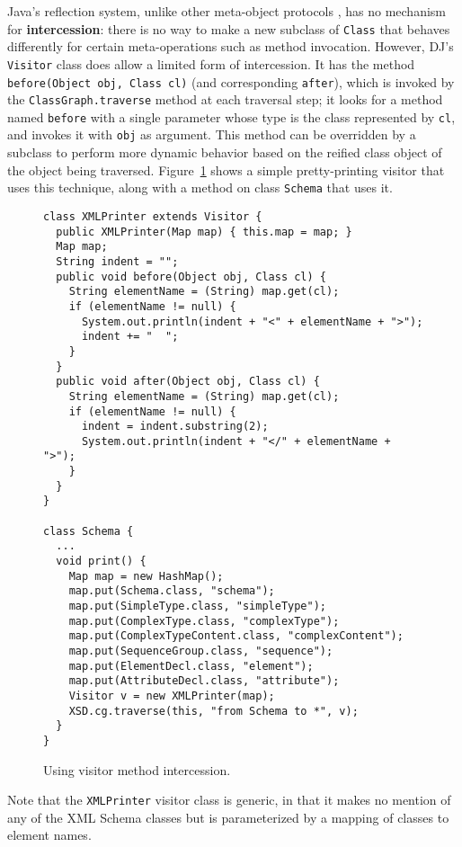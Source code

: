 \documentclass{llncs}
\newcommand{\defn}[1]{\textbf{#1}}
\newcommand{\code}[1]{\texttt{#1}}
\begin{document}
Java's reflection system, unlike other meta-object protocols
\cite{AMOP}, has no mechanism for \defn{intercession}: there is no way
to make a new subclass of \code{Class} that behaves differently for
certain meta-operations such as method invocation.  However, DJ's
\code{Visitor} class does allow a limited form of intercession.  It
has the method \code{before(Object~obj, Class~cl)} (and corresponding
\code{after}), which is invoked by the \code{ClassGraph.traverse}
method at each traversal step; it looks for a method named
\code{before} with a single parameter whose type is the class
represented by \code{cl}, and invokes it with \code{obj} as argument.
This method can be overridden by a subclass to perform more dynamic
behavior based on the reified class object of the object being
traversed.  Figure~\ref{fig:intercession} shows a simple
pretty-printing visitor that uses this technique, along with a method
on class \code{Schema} that uses it.

\begin{figure}[tbhp!]
\begin{minipage}{\textwidth}
\begin{verbatim}
class XMLPrinter extends Visitor {
  public XMLPrinter(Map map) { this.map = map; }
  Map map;
  String indent = "";
  public void before(Object obj, Class cl) {
    String elementName = (String) map.get(cl);
    if (elementName != null) {
      System.out.println(indent + "<" + elementName + ">");
      indent += "  ";
    }
  }
  public void after(Object obj, Class cl) {
    String elementName = (String) map.get(cl);
    if (elementName != null) {
      indent = indent.substring(2);
      System.out.println(indent + "</" + elementName + ">");
    }
  }
}

class Schema {
  ...
  void print() {
    Map map = new HashMap();
    map.put(Schema.class, "schema");
    map.put(SimpleType.class, "simpleType");
    map.put(ComplexType.class, "complexType");
    map.put(ComplexTypeContent.class, "complexContent");
    map.put(SequenceGroup.class, "sequence");
    map.put(ElementDecl.class, "element");
    map.put(AttributeDecl.class, "attribute");
    Visitor v = new XMLPrinter(map);
    XSD.cg.traverse(this, "from Schema to *", v);
  }
}
\end{verbatim}
\end{minipage}
\caption{Using visitor method intercession.}
\label{fig:intercession}
\end{figure}

Note that the \code{XMLPrinter} visitor class is generic, in that it
makes no mention of any of the XML Schema classes but is parameterized
by a mapping of classes to element names.  
\end{document}
